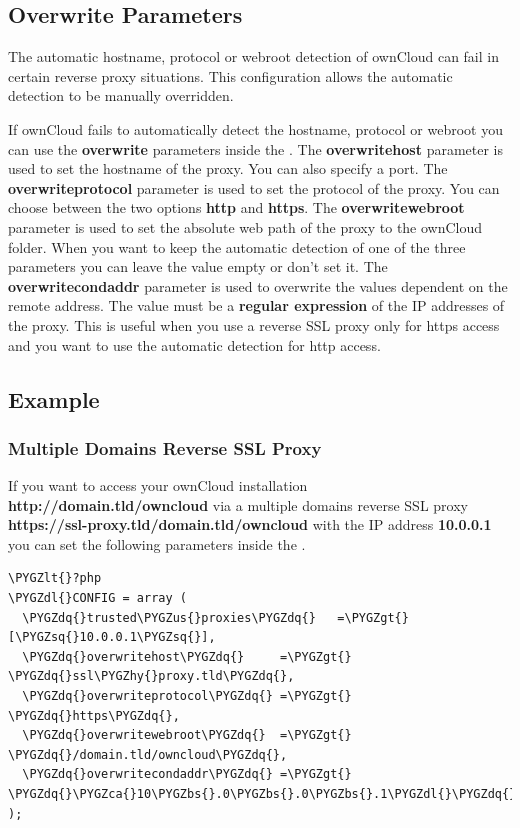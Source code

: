 \documentclass[letterpaper,10pt,english]{sphinxmanual}
\def\PYGZbs{\char`\\}
\def\PYGZus{\char`\_}
\def\PYGZca{\char`\^}
\def\PYGZlt{\char`\<}
\def\PYGZgt{\char`\>}
\def\PYGZdl{\char`\$}
\def\PYGZhy{\char`\-}
\def\PYGZsq{\char`\'}
\def\PYGZdq{\char`\"}
\renewcommand\PYGZsq{\textquotesingle}
\begin{document}
\subsection{Overwrite Parameters}
\label{configuration_server/reverse_proxy_configuration:overwrite-parameters}
The automatic hostname, protocol or webroot detection of ownCloud can fail in
certain reverse proxy situations. This configuration allows the automatic detection
to be manually overridden.

If ownCloud fails to automatically detect the hostname, protocol or webroot
you can use the \textbf{overwrite} parameters inside the .
The \textbf{overwritehost} parameter is used to set the hostname of the proxy. You
can also specify a port. The \textbf{overwriteprotocol} parameter is used to set the
protocol of the proxy. You can choose between the two options \textbf{http} and
\textbf{https}. The \textbf{overwritewebroot} parameter is used to set the absolute web
path of the proxy to the ownCloud folder. When you want to keep the automatic
detection of one of the three parameters you can leave the value empty or don't
set it. The \textbf{overwritecondaddr} parameter is used to overwrite the values
dependent on the remote address. The value must be a \textbf{regular expression} of
the IP addresses of the proxy. This is useful when you use a reverse SSL proxy
only for https access and you want to use the automatic detection for http
access.


\subsection{Example}
\label{configuration_server/reverse_proxy_configuration:example}

\subsubsection{Multiple Domains Reverse SSL Proxy}
\label{configuration_server/reverse_proxy_configuration:multiple-domains-reverse-ssl-proxy}
If you want to access your ownCloud installation \textbf{http://domain.tld/owncloud}
via a multiple domains reverse SSL proxy
\textbf{https://ssl-proxy.tld/domain.tld/owncloud} with the IP address \textbf{10.0.0.1}
you can set the following parameters inside the .

\begin{Verbatim}[commandchars=\\\{\}]
\PYGZlt{}?php
\PYGZdl{}CONFIG = array (
  \PYGZdq{}trusted\PYGZus{}proxies\PYGZdq{}   =\PYGZgt{} [\PYGZsq{}10.0.0.1\PYGZsq{}],
  \PYGZdq{}overwritehost\PYGZdq{}     =\PYGZgt{} \PYGZdq{}ssl\PYGZhy{}proxy.tld\PYGZdq{},
  \PYGZdq{}overwriteprotocol\PYGZdq{} =\PYGZgt{} \PYGZdq{}https\PYGZdq{},
  \PYGZdq{}overwritewebroot\PYGZdq{}  =\PYGZgt{} \PYGZdq{}/domain.tld/owncloud\PYGZdq{},
  \PYGZdq{}overwritecondaddr\PYGZdq{} =\PYGZgt{} \PYGZdq{}\PYGZca{}10\PYGZbs{}.0\PYGZbs{}.0\PYGZbs{}.1\PYGZdl{}\PYGZdq{},
);
\end{Verbatim}
\end{document}
